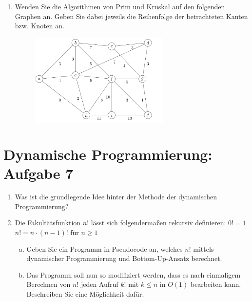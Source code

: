 \documentclass{scrartcl}
\begin{document}
\begin{enumerate}[(1)]
\item Wenden Sie die Algorithmen von Prim und Kruskal auf den folgenden Graphen an. Geben Sie dabei jeweils die Reihenfolge der betrachteten Kanten bzw. Knoten an.

\begin{figure}[h]
\centering
\includegraphics[width=0.66\textwidth]{mst_graph.png}
\end{figure}


\end{enumerate}

\section*{Dynamische Programmierung: Aufgabe 7}
\begin{enumerate}[(1)]

\item Was ist die grundlegende Idee hinter der Methode der dynamischen Programmierung?

\item Die Fakultätsfunktion $n!$ lässt sich folgendermaßen rekursiv definieren: \newline
$0! = 1$\newline
$n! = n\cdot(n-1)!$ 	für $n \geq 1$
\begin{enumerate}[(a)]
\item Geben Sie ein Programm in Pseudocode an, welches $n!$  mittels dynamischer Programmierung und Bottom-Up-Ansatz berechnet.
\item Das Programm soll nun so modifiziert werden, dass es nach einmaligem Berechnen von $n!$ jeden Aufruf $k!$ mit $k \leq n$ in $O(1)$ bearbeiten kann. Beschreiben Sie eine Möglichkeit dafür.
\end{enumerate}


\end{enumerate}
\end{document}
